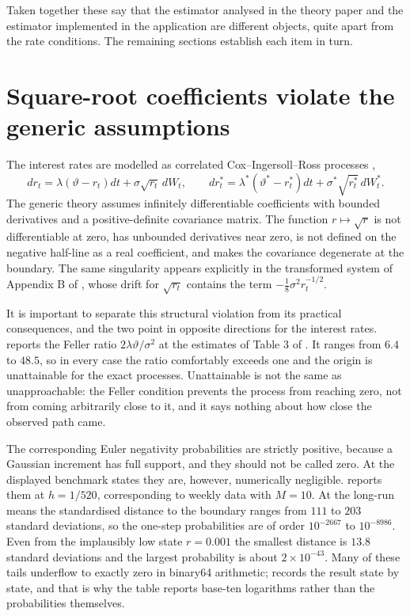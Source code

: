 \documentclass[11pt]{article}
\theoremstyle{definition}
\begin{document}
Taken together these say that the estimator analysed in the theory paper and the estimator implemented in the application are different objects, quite apart from the rate conditions. The remaining sections establish each item in turn.

\section{Square-root coefficients violate the generic assumptions}\label{app:sqrt}

The interest rates are modelled as correlated Cox--Ingersoll--Ross processes \citep{CoxIngersollRoss1985},
\begin{equation}\label{eq:cir_rates}
dr_t=\lambda(\vartheta-r_t)dt+\sigma\sqrt{r_t}\,dW_t,
\qquad
d r_t^*=\lambda^*(\vartheta^*-r_t^*)dt+\sigma^*\sqrt{r_t^*}\,dW_t^*.
\end{equation}
The generic theory assumes infinitely differentiable coefficients with bounded derivatives and a positive-definite covariance matrix. The function $r\mapsto\sqrt r$ is not differentiable at zero, has unbounded derivatives near zero, is not defined on the negative half-line as a real coefficient, and makes the covariance degenerate at the boundary. The same singularity appears explicitly in the transformed system of Appendix B of \citet{BrandtSantaClara2002}, whose drift for $\sqrt{r_t}$ contains the term $-\tfrac18\sigma^2r_t^{-1/2}$.

It is important to separate this structural violation from its practical consequences, and the two point in opposite directions for the interest rates.  reports the Feller ratio $2\lambda\vartheta/\sigma^2$ at the estimates of Table 3 of \citet{BrandtSantaClara2002}. It ranges from $6.4$ to $48.5$, so in every case the ratio comfortably exceeds one and the origin is unattainable for the exact processes. Unattainable is not the same as unapproachable: the Feller condition prevents the process from reaching zero, not from coming arbitrarily close to it, and it says nothing about how close the observed path came.

The corresponding Euler negativity probabilities are strictly positive, because a Gaussian increment has full support, and they should not be called zero. At the displayed benchmark states they are, however, numerically negligible.  reports them at $h=1/520$, corresponding to weekly data with $M=10$. At the long-run means the standardised distance to the boundary ranges from $111$ to $203$ standard deviations, so the one-step probabilities are of order $10^{-2667}$ to $10^{-8986}$. Even from the implausibly low state $r=0.001$ the smallest distance is $13.8$ standard deviations and the largest probability is about $2\times10^{-43}$. Many of these tails underflow to exactly zero in binary64 arithmetic;  records the result state by state, and that is why the table reports base-ten logarithms rather than the probabilities themselves.
\end{document}
